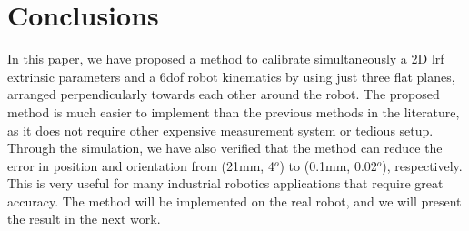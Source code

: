 \section{Conclusions}
\label{sec:conclusions}

In this paper, we have proposed a method to calibrate simultaneously a 2D \ac{lrf} extrinsic parameters and a 6\ac{dof} robot kinematics by using just three flat planes, arranged perpendicularly towards each other around the robot. The proposed method is much easier to implement than the previous methods in the literature, as it does not require other expensive measurement system or tedious setup. Through the simulation, we have also verified that the method can reduce the error in position and orientation from (21mm, 4$^o$) to (0.1mm, 0.02$^o$), respectively. This is very useful for many industrial robotics applications that require great accuracy. The method will be implemented on the real robot, and we will present the result in the next work. 

